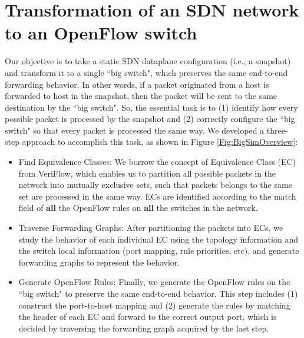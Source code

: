 \section{Transformation of an SDN network to an OpenFlow switch}
\label{Sec:Design}

Our objective is to take a static SDN dataplane configuration (i.e., a snapshot) and transform it to a single ``big switch", which preserves the same end-to-end forwarding behavior. In other words, if a packet originated from a host is forwarded to host in the snapshot, then the packet will be sent to the same destination by the ``big switch". So, the essential task is to (1) identify how every possible packet is processed by the snapshot and (2) correctly configure the ``big switch" so that every packet is processed the same way. We developed a three-step approach to accomplish this task, as shown in Figure \ref{Fig:BigSimOverview}:

\begin{itemize}
\item Find Equivalence Classes: We borrow the concept of Equivalence Class (EC) from VeriFlow\cite{Veriflow}, which enables us to partition all possible packets in the network into mutually exclusive sets, such that packets belongs to the same set are processed in the same way. ECs are identified according to the match field of \textbf{all} the OpenFlow rules on \textbf{all} the switches in the network.
\item Traverse Forwarding Graphs: After partitioning the packets into ECs, we study the behavior of each individual EC using the topology information and the switch local information (port mapping, rule priorities, etc), and generate forwarding graphs to represent the behavior.  
\item Generate OpenFlow Rules: Finally, we generate the OpenFlow rules on the ``big switch" to preserve the same end-to-end behavior. This step includes (1) construct the port-to-host mapping and (2) generate the rules by matching the header of each EC and forward to the correct output port, which is decided by traversing the forwarding graph acquired by the last step.
\end{itemize}

